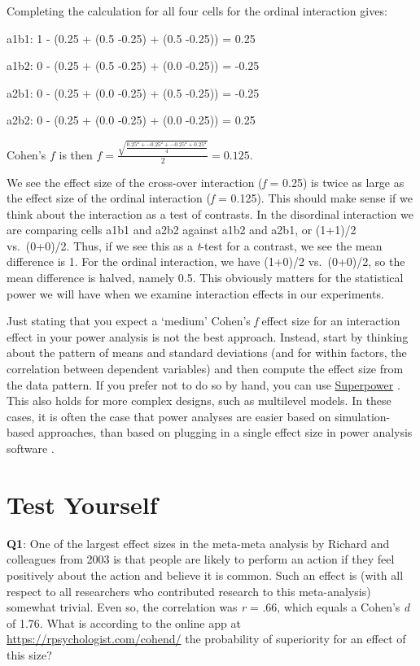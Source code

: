 \documentclass[
  oneside]{book}
\begin{document}
Completing the calculation for all four cells for the ordinal interaction gives:

a1b1: 1 - (0.25 + (0.5 -0.25) + (0.5 -0.25)) = 0.25

a1b2: 0 - (0.25 + (0.5 -0.25) + (0.0 -0.25)) = -0.25

a2b1: 0 - (0.25 + (0.0 -0.25) + (0.5 -0.25)) = -0.25

a2b2: 0 - (0.25 + (0.0 -0.25) + (0.0 -0.25)) = 0.25

Cohen's \(f\) is then \(f = \frac { \sqrt { \frac { 0.25^2 +-0.25^2 + -0.25^2 + 0.25^2 } { 4 } }}{ 2 } = 0.125\).

We see the effect size of the cross-over interaction (\emph{f} = 0.25) is twice as large as the effect size of the ordinal interaction (\emph{f} = 0.125). This should make sense if we think about the interaction as a test of contrasts. In the disordinal interaction we are comparing cells a1b1 and a2b2 against a1b2 and a2b1, or (1+1)/2 vs.~(0+0)/2. Thus, if we see this as a \emph{t}-test for a contrast, we see the mean difference is 1. For the ordinal interaction, we have (1+0)/2 vs.~(0+0)/2, so the mean difference is halved, namely 0.5. This obviously matters for the statistical power we will have when we examine interaction effects in our experiments.

Just stating that you expect a `medium' Cohen's \emph{f} effect size for an interaction effect in your power analysis is not the best approach. Instead, start by thinking about the pattern of means and standard deviations (and for within factors, the correlation between dependent variables) and then compute the effect size from the data pattern. If you prefer not to do so by hand, you can use \href{https://aaroncaldwell.us/SuperpowerBook/}{Superpower} \citep{lakens_simulation-based_2021}. This also holds for more complex designs, such as multilevel models. In these cases, it is often the case that power analyses are easier based on simulation-based approaches, than based on plugging in a single effect size in power analysis software \citep{debruine_understanding_2021}.

\hypertarget{test-yourself-4}{%
\section{Test Yourself}\label{test-yourself-4}}

\textbf{Q1}: One of the largest effect sizes in the meta-meta analysis by Richard and colleagues from 2003 is that people are likely to perform an action if they feel positively about the action and believe it is common. Such an effect is (with all respect to all researchers who contributed research to this meta-analysis) somewhat trivial. Even so, the correlation was \emph{r} = .66, which equals a Cohen's \emph{d} of 1.76. What is according to the online app at \url{https://rpsychologist.com/cohend/} the probability of superiority for an effect of this size?
\end{document}
